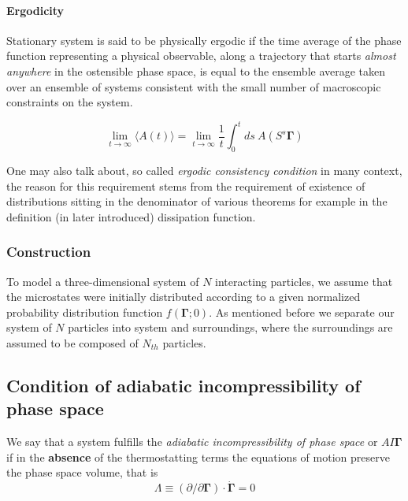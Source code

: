 \documentclass[a4paper,12pt,nofootinbib]{article}
\begin{document}

\paragraph{Ergodicity}
Stationary system is said to be physically ergodic if the time average of the phase function representing a physical observable, along a trajectory that starts \textit{almost anywhere} in the ostensible phase space, is equal to the ensemble average taken over an ensemble of systems consistent with the small number of macroscopic constraints on the system.

\begin{equation}
    \lim_{t \to \infty} \langle A(t) \rangle = \lim_{t \to \infty} \frac{1}{t} \int_0^t ds\ A(S^s \bm{\Gamma})
\end{equation}

One may also talk about, so called \textit{ergodic consistency condition} in many context, the reason for this requirement stems from the requirement of existence of distributions sitting in the denominator of various theorems for example in the definition (in later introduced) dissipation function.

\subsubsection{Construction}

To model a three-dimensional system of $N$ interacting particles, we assume that the microstates were initially distributed according to a given normalized probability distribution function $f(\bm{\Gamma};0)$. As mentioned before we separate our system of $N$ particles into system and surroundings, where the surroundings are assumed to be composed of $N_{th}$ particles. 




\subsection{Condition of adiabatic incompressibility of phase space}

We say that a system fulfills the \textit{adiabatic incompressibility of phase space} or $AI\bm{\Gamma}$ if in the \textbf{absence} of the thermostatting terms the equations of motion preserve the phase space volume, that is
\begin{equation}
  \Lambda \equiv (\partial / \partial\bm{\Gamma}) \cdot \dot{\bm{\Gamma}}=0
\end{equation}
\end{document}
